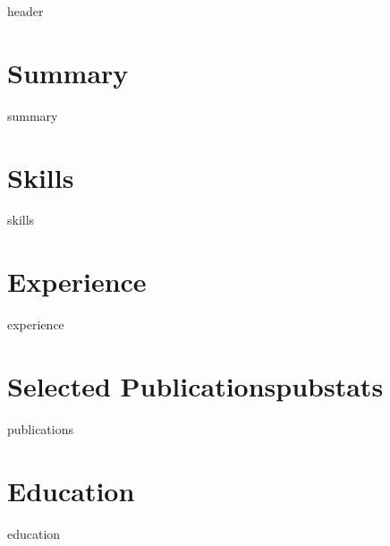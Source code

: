 \documentclass[10pt]{article}
\begin{document}
{{header}}

\section{Summary}
{\small {{summary}}}

\section{Skills}
{\small {{skills}}}

\section{Experience}
{\small
{{experience}}
}

\section{Selected Publications\texorpdfstring{\hfill{\normalfont\footnotesize {{pubstats}}}}{}}
{\small {{publications}}}

\section{Education}
{\small {{education}}}
\end{document}
